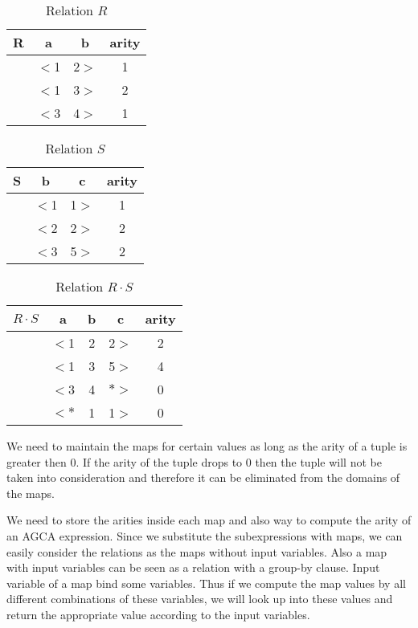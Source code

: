 \documentclass[12pt]{article}
\begin{document}
\begin{table}[ht]
\centering
\begin{tabular}{c c c c}
	R & a & b & arity\\ [0.2ex]
	\hline
	  & $<$1 & 2$>$ & 1 \\
	  & $<$1 & 3$>$ & 2 \\
	  & $<$3 & 4$>$ & 1 \\
\end{tabular}
\caption{Relation $R$}
\end{table}
\begin{table}[ht]
\centering
\begin{tabular}{c c c c}
	S & b & c & arity\\ [0.2ex]
	\hline
	  & $<$1 & 1$>$ & 1 \\
	  & $<$2 & 2$>$ & 2 \\
	  & $<$3 & 5$>$ & 2 \\
\end{tabular}
\caption{Relation $S$}
\end{table}
\begin{table}[ht]
\centering
\begin{tabular}{c c c c c}
	$R\cdot S$ & a & b & c & arity\\ [0.2ex]
	\hline
	  & $<$1 & 2 & 2$>$ & 2 \\
	  & $<$1 & 3 & 5$>$ & 4 \\
	  & $<$3 & 4 & $*>$ & 0 \\
	  & $<*$ & 1 & 1$>$ & 0 \\
\end{tabular}
\caption{Relation $R\cdot S$}
\end{table}

We need to maintain the maps for certain values as long as the arity of a tuple is greater then 0. If the arity  of the tuple drops to 0 then the tuple will not be taken into consideration and therefore it can be eliminated from the domains of the maps.

We need to store the arities inside each map and also way to compute the arity of an AGCA expression. Since we substitute the subexpressions with maps, we can easily consider the relations as the maps without input variables. Also a map with input variables can be seen as a relation with a group-by clause. Input variable of a map bind some variables. Thus if we compute the map values by all different combinations of these variables, we will look up into these values and return the appropriate value according to the input variables.  
\end{document}
